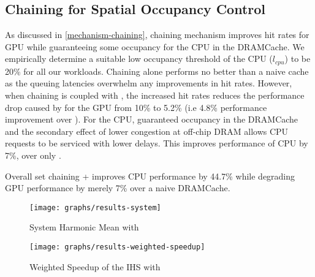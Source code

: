 
\subsection{Chaining for Spatial Occupancy Control}
As discussed in \ref{mechanism-chaining}, chaining mechanism improves hit rates for GPU while guaranteeing some occupancy for the CPU in the DRAMCache. We empirically determine a suitable low occupancy threshold of the CPU (\textit{$l_{cpu}$}) to be 20\% for all our workloads. Chaining alone performs no better than a naive cache as the queuing latencies overwhelm any improvements in hit rates. However, when chaining is coupled with \prioname, the increased hit rates reduces the performance drop caused by \prioname for the GPU from 10\% to 5.2\% (i.e 4.8\% performance improvement over \prioname). For the CPU, guaranteed occupancy in the DRAMCache and the secondary effect of lower congestion at off-chip DRAM allows CPU requests to be serviced with lower delays. This improves performance of CPU by 7\%, over only \prioname.
\par Overall set chaining + \prioname improves CPU performance by 44.7\% while degrading GPU performance by merely 7\% over a naive DRAMCache.

\begin{figure}[!htb]
    \centering
    \texttt{[image: graphs/results-system]}
    \caption{System Harmonic Mean with \cachename}
    \label{results-system}
\end{figure}

\begin{figure}[!htb]
    \centering
    \texttt{[image: graphs/results-weighted-speedup]}
    \caption{Weighted Speedup of the IHS with \cachename}
    \label{results-ws}
\end{figure}

